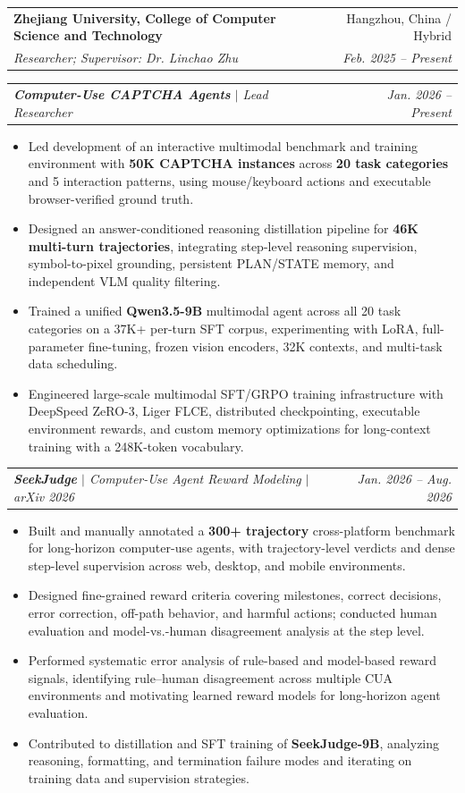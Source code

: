 \documentclass[letterpaper,11pt]{article}
\makeatletter
\newcommand{\resumeItem}[1]{
  \item\small{%
    {#1\vspace{-2pt}}%
  }
}
\newcommand{\resumeSubheading}[4]{
  \vspace{-2pt}\item
    \begin{tabular*}{0.97\textwidth}[t]{l@{\extracolsep{\fill}}r}
      \textbf{#1} & #2 \\
      \textit{\small#3} & \textit{\small #4} \\
    \end{tabular*}\vspace{-7pt}
}
\newcommand{\resumeSubSubheading}[2]{
    \item
    \begin{tabular*}{0.97\textwidth}{l@{\extracolsep{\fill}}r}
      \textit{\small#1} & \textit{\small #2} \\
    \end{tabular*}\vspace{-7pt}
}
\newcommand{\resumeItemListStart}{\begin{itemize}}
\newcommand{\resumeItemListEnd}{\end{itemize}\vspace{-5pt}}
\makeatother
\begin{document}
  \resumeSubheading
    {Zhejiang University, College of Computer Science and Technology}{Hangzhou, China / Hybrid}
    {Researcher; Supervisor: Dr. Linchao Zhu}{Feb. 2025 -- Present}

  \resumeSubSubheading
    {\textbf{Computer-Use CAPTCHA Agents} $|$ Lead Researcher}{Jan. 2026 -- Present}
  \resumeItemListStart
    \resumeItem{Led development of an interactive multimodal benchmark and training environment with \textbf{50K CAPTCHA instances} across \textbf{20 task categories} and 5 interaction patterns, using mouse/keyboard actions and executable browser-verified ground truth.}
    \resumeItem{Designed an answer-conditioned reasoning distillation pipeline for \textbf{46K multi-turn trajectories}, integrating step-level reasoning supervision, symbol-to-pixel grounding, persistent PLAN/STATE memory, and independent VLM quality filtering.}
    \resumeItem{Trained a unified \textbf{Qwen3.5-9B} multimodal agent across all 20 task categories on a 37K+ per-turn SFT corpus, experimenting with LoRA, full-parameter fine-tuning, frozen vision encoders, 32K contexts, and multi-task data scheduling.}
    \resumeItem{Engineered large-scale multimodal SFT/GRPO training infrastructure with DeepSpeed ZeRO-3, Liger FLCE, distributed checkpointing, executable environment rewards, and custom memory optimizations for long-context training with a 248K-token vocabulary.}
  \resumeItemListEnd

  \resumeSubSubheading
    {\textbf{SeekJudge} $|$ Computer-Use Agent Reward Modeling $|$ arXiv 2026}{Jan. 2026 -- Aug. 2026}
  \resumeItemListStart
    \resumeItem{Built and manually annotated a \textbf{300+ trajectory} cross-platform benchmark for long-horizon computer-use agents, with trajectory-level verdicts and dense step-level supervision across web, desktop, and mobile environments.}
    \resumeItem{Designed fine-grained reward criteria covering milestones, correct decisions, error correction, off-path behavior, and harmful actions; conducted human evaluation and model-vs.-human disagreement analysis at the step level.}
    \resumeItem{Performed systematic error analysis of rule-based and model-based reward signals, identifying rule--human disagreement across multiple CUA environments and motivating learned reward models for long-horizon agent evaluation.}
    \resumeItem{Contributed to distillation and SFT training of \textbf{SeekJudge-9B}, analyzing reasoning, formatting, and termination failure modes and iterating on training data and supervision strategies.}
  \resumeItemListEnd
\end{document}
